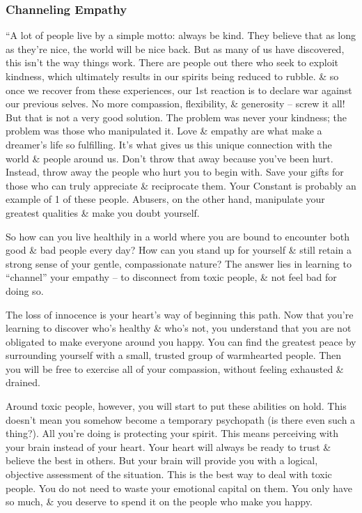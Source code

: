 \documentclass{article}
\numberwithin{equation}{section}
\begin{document}
\subsubsection{Channeling Empathy}
``A lot of people live by a simple motto: always be kind. They believe that as long as they're nice, the world will be nice back. But as many of us have discovered, this isn't the way things work. There are people out there who seek to exploit kindness, which ultimately results in our spirits being reduced to rubble. \& so once we recover from these experiences, our 1st reaction is to declare war against our previous selves. No more compassion, flexibility, \& generosity -- screw it all! But that is not a very good solution. The problem was never your kindness; the problem was those who manipulated it. Love \& empathy are what make a dreamer's life so fulfilling. It's what gives us this unique connection with the world \& people around us. Don't throw that away because you've been hurt. Instead, throw away the people who hurt you to begin with. Save your gifts for those who can truly appreciate \& reciprocate them. Your Constant is probably an example of 1 of these people. Abusers, on the other hand, manipulate your greatest qualities \& make you doubt yourself.

So how can you live healthily in a world where you are bound to encounter both good \& bad people every day? How can you stand up for yourself \& still retain a strong sense of your gentle, compassionate nature? The answer lies in learning to ``channel'' your empathy -- to disconnect from toxic people, \& not feel bad for doing so.

The loss of innocence is your heart's way of beginning this path. Now that you're learning to discover who's healthy \& who's not, you understand that you are not obligated to make everyone around you happy. You can find the greatest peace by surrounding yourself with a small, trusted group of warmhearted people. Then you will be free to exercise all of your compassion, without feeling exhausted \& drained.

Around toxic people, however, you will start to put these abilities on hold. This doesn't mean you somehow become a temporary psychopath (is there even such a thing?). All you're doing is protecting your spirit. This means perceiving with your brain instead of your heart. Your heart will always be ready to trust \& believe the best in others. But your brain will provide you with a logical, objective assessment of the situation. This is the best way to deal with toxic people. You do not need to waste your emotional capital on them. You only have so much, \& you deserve to spend it on the people who make you happy.
\end{document}
